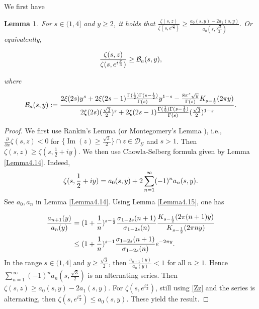 \documentclass[reqno,english]{amsart}
\newtheorem{lemma}{Lemma}[section]
\newtheorem{open problem}{Open Problem}[section]
\newtheorem{open question}{Open Question}[section]
\newtheorem{open questions on hexagonal lattice}{Open Questions on hexagonal lattice}[section]
\renewcommand{\Im}{\operatorname{Im}}
\begin{document}
 We first have
\begin{lemma}\label{Lemma4b}
For $s\in(1,4]$ and $y\geq2$, it holds that
$
\frac{\zeta(s,z)}{\zeta(s,e^{i\frac{\pi}{3}})}\geq\frac{a_0(s,y)-2a_1(s,y)}{a_0(s,\frac{\sqrt3}{2})}.
$ Or equivalently,

 \begin{equation}\aligned\nonumber
\frac{\zeta(s,z)}{\zeta(s,e^{i\frac{\pi}{3}})}\geq
\mathcal{B}_a(s,y),
\endaligned\end{equation}

where


 \begin{equation}\aligned\nonumber
\mathcal{B}_a(s,y):=
\frac{2\xi(2s)y^s+
2\xi(2s-1)\frac{\Gamma(\frac{1}{2})\Gamma(s-\frac{1}{2})}{\Gamma(s)}y^{1-s}
-\frac{8\pi^s\sqrt{y}}{\Gamma(s)}K_{s-\frac{1}{2}}(2\pi y)}
{2\xi(2s)(\frac{\sqrt3}{2})^s+
2\xi(2s-1)\frac{\Gamma(\frac{1}{2})\Gamma(s-\frac{1}{2})}{\Gamma(s)}(\frac{\sqrt3}{2})^{1-s}
}.
\endaligned\end{equation}

\end{lemma}

\begin{proof} We first use Rankin's Lemma (or Montegomery's Lemma \cite{Mon1988,Ran1953}), i.e., $\frac{\partial}{\partial x}\zeta(s,z)<0$ for
$\{\Im(z)\geq\frac{\sqrt3}{2}\}\cap z\in\mathcal{D}_{\mathcal{G}}$ and $s>1$. Then $\zeta(s,z)\geq \zeta(s,\frac{1}{2}+iy)$.
We then use Chowla-Selberg formula given by Lemma \ref{Lemma4.14}.
Indeed,
 \begin{equation}\aligned\label{Zz}
\zeta(s,\frac{1}{2}+iy)=a_0(s,y)+2\sum_{n=1}^\infty (-1)^n a_n(s,y).
\endaligned\end{equation}
See $a_0, a_n$ in Lemma \ref{Lemma4.14}. Using Lemma \ref{Lemma4.15}, one has

 \begin{equation}\aligned\nonumber
\frac{a_{n+1}(y)}{a_n(y)}&=(1+\frac{1}{n})^{s-\frac{1}{2}}\frac{\sigma_{1-2s}(n+1)}{\sigma_{1-2s}(n)}
\frac{K_{s-\frac{1}{2}}(2\pi(n+1)y)}{K_{s-\frac{1}{2}}(2\pi ny)}\\
&\leq(1+\frac{1}{n})^{s-1}\frac{\sigma_{1-2s}(n+1)}{\sigma_{1-2s}(n)} e^{-2\pi y}.
\endaligned\end{equation}
In the range $s\in(1,4]$ and $y\geq\frac{\sqrt3}{2}$, then $\frac{a_{n+1}(y)}{a_n(y)}<1$ for all $n\geq1$.
Hence $\sum_{n=1}^\infty (-1)^n a_n(s,\frac{\sqrt3}{2})$ is an alternating series. Then $\zeta(s,z)\geq a_0(s,y)- 2a_1(s,y)$.
For $\zeta(s,e^{i\frac{\pi}{3}})$,  still using \eqref{Zz} and the series is alternating, then $\zeta(s,e^{i\frac{\pi}{3}})\leq a_0(s,y)$.
These yield the result.

\end{proof}
\end{document}
